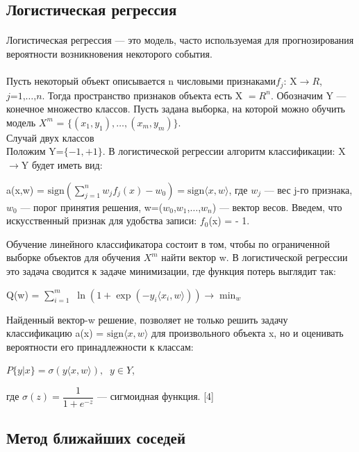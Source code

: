\documentclass{article}
\begin{document}
	\subsection{Логистическая регрессия}
	\paragraph{}
	Логистическая регрессия — это модель, часто используемая для прогнозирования вероятности возникновения некоторого события. 
	\paragraph{}
	Пусть некоторый объект описывается n числовыми признаками$f_j$: X$\to$$\textit{R}$, $\textit{j=1,\ldots,n}$. Тогда пространство признаков объекта есть X $=\textit{R}^n$. Обозначим Y — конечное множество классов.
	Пусть задана выборка, на которой можно обучить модель $X^m$ = $\{(x_1,y_1),\dots,(x_m,y_m)\}.$\\
	\newpage
	Случай двух классов\\
	Положим Y=$\{-1,+1\}$. В логистической регрессии алгоритм классификации: X$\to$Y будет иметь вид:
	
	a(x,w) = $\mathrm{sign}\left( \sum_{j=1}^n w_j f_j(x) - w_0 \right) = \mathrm{sign}\langle x,w \rangle$,
	где $w_j$ — вес j-го признака, $w_0$ — порог принятия решения, w=($w_0$,$w_1$,$\ldots$,$w_n$) — вектор весов. Введем, что искусственный признак для удобства записи: $f_{0}$(x) = - 1.
	
	Обучение линейного классификатора состоит в том, чтобы по ограниченной выборке объектов для обучения $X^m$ найти вектор w. В логистической регрессии это задача сводится к задаче минимизации, где функция потерь выглядит так:
	
	Q(w) = $\sum_{i=1}^m$ $\ln\left( 1 + \exp( -y_i \langle x_i,w \rangle ) \right) \to \min_{w}$
	
	Найденный вектор-w решение, позволяет не только решить задачу классификацию a(x) = $\mathrm{sign}\langle x,w \rangle$ для произвольного объекта x, но и оценивать вероятности его принадлежности к классам:
	
	$\textit{P}\{y|x\} = \sigma\left( y \langle x,w \rangle\right),\;\; y\in Y$,
	
	$ \text{где } \sigma(z) = \dfrac{1}{1+e^{-z}}$  — сигмоидная функция. [4] 
	
	\subsection{Метод ближайших соседей}
\end{document}
